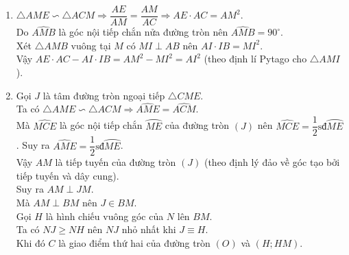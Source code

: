 \begin{bt}
{\begin{enumerate}
			Suy ra $\widehat{AMN}=\widehat{ACM}$ (hai góc nội tiếp của $(O)$ chắn hai cung bằng nhau).\\
			Xét $\triangle AME$ và $\triangle ACM$ có
			\begin{center}
				$\begin{cases}
				\widehat{AME}=\widehat{ACM}\\ 
				\widehat{A}\text{ chung}
				\end{cases}$
			\end{center}
			$\Rightarrow \triangle AME \backsim\triangle ACM$ (g.g).
			\item $\triangle AME \backsim \triangle ACM\Rightarrow \dfrac{AE}{AM}=\dfrac{AM}{AC}\Rightarrow AE\cdot AC=AM^2$.\\
			Do $\widehat{AMB}$ là góc nội tiếp chắn nửa đường tròn nên $\widehat{AMB}=90^\circ$.\\
			Xét $\triangle AMB$ vuông tại $M$ có $MI\perp AB$ nên $AI\cdot IB=MI^2$.\\
			Vậy $AE\cdot AC-AI\cdot IB=AM^2-MI^2=AI^2$ (theo định lí Pytago cho $\triangle AMI$).
			\item Gọi $J$ là tâm đường tròn ngoại tiếp $\triangle CME$.\\
			Ta có $\triangle AME\backsim\triangle ACM\Rightarrow \widehat{AME}=\widehat{ACM}$.\\
			Mà $\widehat{MCE}$ là góc nội tiếp chắn $\wideparen{ME}$ của đường tròn $(J)$ nên $\widehat{MCE}=\dfrac{1}{2} \text{sđ}\wideparen{ME}$. Suy ra 
			$\widehat{AME}=\dfrac{1}{2} \text{sđ}\wideparen{ME}$.\\
			Vậy $AM$ là tiếp tuyến của đường tròn $(J)$ (theo định lý đảo về góc tạo bởi tiếp tuyến và dây cung).\\
			Suy ra $AM\perp JM$.\\
			Mà $AM\perp BM$ nên $J\in BM$.\\
			Gọi $H$ là hình chiếu vuông góc của $N$ lên $BM$.\\
			Ta có $NJ\ge NH$ nên $NJ$ nhỏ nhất khi $J\equiv H$.\\
			Khi đó $C$ là giao điểm thứ hai của đường tròn $(O)$ và $(H;HM)$.
		\end{enumerate}
	}
\end{bt}

